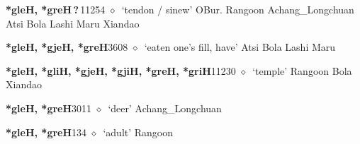   \begin{list}{}{\leftmargin=1.5em \itemindent=-1.5em}
  \item {\footnotesize \textbf{*gleH, *greH\,?\,}}{\tiny 11254}
         $\diamond$~`tendon / sinew'
         OBur. 
\hspace{1ex}
         Rangoon 
\hspace{1ex}
         Achang\_Longchuan 
\hspace{1ex}
         Atsi 
\hspace{1ex}
         Bola 
\hspace{1ex}
         Lashi 
\hspace{1ex}
         Maru 
\hspace{1ex}
         Xiandao 
  \item {\footnotesize \textbf{*gleH, *gjeH, *greH}}{\tiny 3608}
\hspace{1ex}
         $\diamond$~`eaten one's fill, have'
         Atsi 
\hspace{1ex}
         Bola 
\hspace{1ex}
         Lashi 
\hspace{1ex}
         Maru 
  \item {\footnotesize \textbf{*gleH, *gliH, *gjeH, *gjiH, *greH, *griH}}{\tiny 11230}
\hspace{1ex}
         $\diamond$~`temple'
         Rangoon 
\hspace{1ex}
         Bola 
\hspace{1ex}
         Xiandao 
  \item {\footnotesize \textbf{*gleH, *greH}}{\tiny 3011}
\hspace{1ex}
         $\diamond$~`deer'
         Achang\_Longchuan 
  \item {\footnotesize \textbf{*gleH, *greH}}{\tiny 134}
\hspace{1ex}
         $\diamond$~`adult'
         Rangoon 

\end{list}
